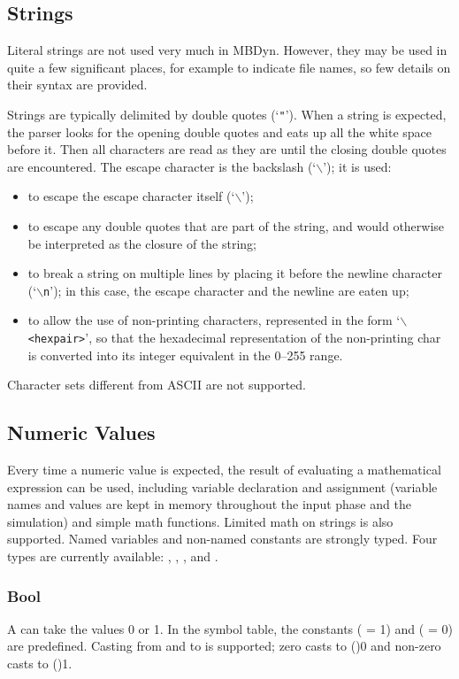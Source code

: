\subsection{Strings}
Literal strings are not used very much in MBDyn.
However, they may be used in quite a few significant places,
for example to indicate file names, so few details on their syntax
are provided.

Strings are typically delimited by double quotes (`\texttt{"}').
When a string is expected, the parser looks for the opening 
double quotes and eats up all the white space before it.
Then all characters are read as they are until the closing 
double quotes are encountered.
The escape character is the backslash (`$\backslash$'); it is used:
\begin{itemize}
	\item to escape the escape character itself (`$\backslash$');
	\item to escape any double quotes that are part of the string,
		and would otherwise be interpreted as the closure
		of the string;
	\item to break a string on multiple lines by placing it
		before the newline character (`\texttt{$\backslash$n}');
		in this case, the escape character and the newline
		are eaten up;
	\item to allow the use of non-printing characters,
		represented in the form `\texttt{$\backslash$<hexpair>}',
		so that the hexadecimal representation of the
		non-printing char is converted into its integer
		equivalent in the 0--255 range.
\end{itemize}
Character sets different from ASCII are not supported.



\subsection{Numeric Values}
Every time a numeric value is expected, the result of evaluating 
a mathematical expression can be used, including variable declaration 
and assignment (variable names and values are kept in memory throughout
the input phase and the simulation) and simple math functions.
Limited math on strings is also supported.
Named variables and non-named constants are strongly typed.
Four types are currently available: , , , and .

\subsubsection{Bool}
\label{sec:bool}
A  can take the values 0 or 1.
In the symbol table, the constants  ( = 1) and  ( = 0) are predefined.
Casting from  and  to  is supported; zero casts to ()0
and non-zero casts to ()1.

